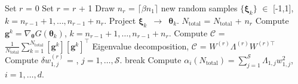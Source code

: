 \begin{breakablealgorithm}
\begin{algorithmic}[1]
	\State Set $r$ = 0
	\Loop
		\State Set $r$ = $r$ + 1
		\State Draw $n_r$ = $\lceil \beta n_1 \rceil$ new random samples 
                $\{\bm{\xi}_k\}$ $\in$ [-1,1], $k = n_{r-1}+1,\ldots,n_{r-1}+n_r$.
		\State Project $\bm{\xi}_k$~$\rightarrow$~$\bm{\theta}_k$.
		\State $N_\text{total}$ = $N_\text{total}$ + $n_r$ 
		\State Compute $\bm{g}^k = \nabla_{\bm{\theta}}G(\bm\theta_k)$, 
             	$k=n_{r-1}+1, \ldots, n_{r-1}+n_r$.  
		\State Compute $\mathcal{C}$ = 
        	$\frac{1}{N_\text{total}}\sum\limits_{k=1}^{N_\text{total}}[\bm{g}^k][\bm{g}^k]^\top$
		\State Eigenvalue decomposition, $\mathcal{C}$ = $W^{(r)}\Lambda^{(r)} W^{(r)\top}$
		\State Compute $\delta w_{1,j}^{(r)}$ = 
                       , 
                       $j = 1,\ldots,\mathcal{S}$.
			\State break
		\EndIf
	\EndLoop
	\State Compute $\alpha_i(N_\text{total}) = \sum\limits_{j=1}^{\mathcal{S}} \Lambda_{1,j}w_{1,j}^2$,
	$i=1,\ldots,d$.
	
    \EndProcedure
  \end{algorithmic}
  \label{alg:screen}
\end{breakablealgorithm}
\bigskip


